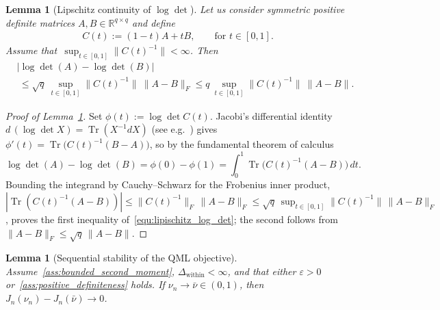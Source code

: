 \documentclass[10pt, letterpaper]{amsart}
\DeclareMathOperator{\Tr}{Tr}
\newtheorem{lem}[theorem]{Lemma}
\begin{document}
\begin{lem}[Lipschitz continuity of $\log \det$]\label{lem:lipischitz_log_det}
    Let us consider symmetric positive definite matrices $A,B \in \mathbb{R}^{q \times q}$ and define
    \begin{align}
        C(t):=(1-t)A + tB,\qquad  \mbox{for } t\in[0,1].
    \end{align}
    Assume that~$\sup_{t \in [0,1]} \|C(t)^{-1} \| < \infty$. Then
    \begin{align}\label{equ:lipischitz_log_det}
        & \left| \log \det (A) - \log \det (B)\right|  \\
        & \ \leq \sqrt{q} \ \sup_{t \in [0,1]} \|C(t)^{-1} \| \  \| A-B \|_F \leq q \ \sup_{t \in [0,1]} \|C(t)^{-1} \| \ \| A- B\|.
    \end{align}
\end{lem}

\begin{proof}[Proof of Lemma~\ref{lem:lipischitz_log_det}]
Set $\phi(t):=\log\det C(t)$. Jacobi's differential identity $d\,(\log\det X)=\Tr (X^{-1}dX)$ (see e.g.~\cite[Section~A.4.1]{BoydVandenberghe2004}) gives $\phi'(t)=\Tr\bigl(C(t)^{-1}(B-A)\bigr)$, so by the fundamental theorem of calculus
\[
\log\det(A)-\log\det(B)
=\phi(0)-\phi(1)=\int_0^1 \Tr \!\bigl(C(t)^{-1}(A-B)\bigr)\,dt .
\]
Bounding the integrand by Cauchy--Schwarz for the Frobenius inner product, $|\Tr(C(t)^{-1}(A-B))|\le \|C(t)^{-1}\|_F\,\|A-B\|_F\leq \sqrt{q}\,\sup_{t\in[0,1]}\|C(t)^{-1}\|\,\|A-B\|_F$, proves the first inequality of~\eqref{equ:lipischitz_log_det}; the second follows from $\|A-B\|_F\le \sqrt{q}\,\|A-B\|$.
\end{proof}

\begin{lem}[Sequential stability of the QML objective]\label{lem:seq_continuity_J}
Assume~\ref{ass:bounded_second_moment}, $\Delta_{\mathrm{within}}<\infty$, and that either
$\varepsilon>0$ or~\ref{ass:positive_definiteness} holds. If
$\nu_n\to\bar\nu\in(0,1)$, then $J_n(\nu_n)-J_n(\bar\nu)\longrightarrow0$.
\end{lem}
\end{document}
